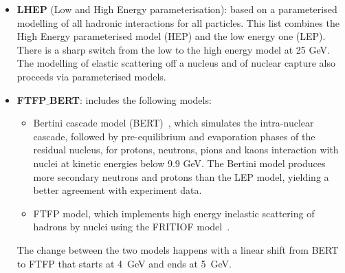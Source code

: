 \begin{itemize}
\item {\bf LHEP} (Low and High Energy parameterisation): based on a parameterised modelling of all hadronic 
interactions for all particles. This list combines the High Energy parameterised model (HEP) and the low energy 
one (LEP). There is a sharp switch from the low to the high energy model at 25 GeV. The modelling of elastic 
scattering off a nucleus and of nuclear capture also proceeds via parameterised models.
%
\item { \bf FTFP$\_$BERT}: includes the following models:
%
\begin{itemize}
%
\item Bertini cascade model (BERT)~\cite{Bertini:1963zzc}, which simulates the intra-nuclear cascade, followed by pre-equilibrium 
and evaporation phases of the residual nucleus, for protons, neutrons, pions and kaons interaction with 
nuclei at kinetic energies below 9.9 GeV. The Bertini model produces more secondary neutrons and protons
than the LEP model, yielding a better agreement with experiment data.
\item FTFP model, which implements high energy inelastic scattering of hadrons by nuclei using
the FRITIOF model~\cite{Andersson:1992iq}.
%
\end{itemize}
%
The change between the two models happens with a linear shift from BERT to FTFP that starts at 4~GeV and ends at 5~GeV.
%
\end{itemize}

